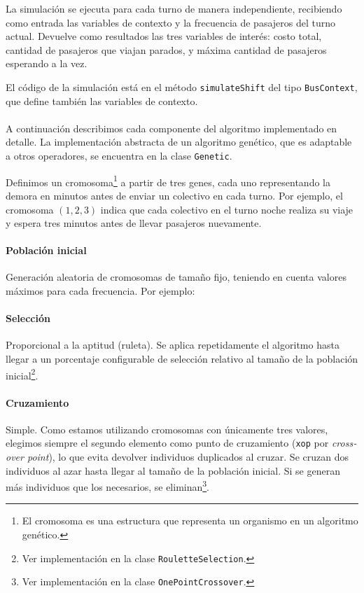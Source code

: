 \documentclass{conaiisi}
\begin{document}
\begin{multicols}{2}
La simulación se ejecuta para cada turno de manera independiente, recibiendo como entrada las variables de contexto y la frecuencia de pasajeros del turno actual.
Devuelve como resultados las tres variables de interés: costo total, cantidad de pasajeros que viajan parados, y máxima cantidad de pasajeros esperando a la vez.

El código de la simulación está en el método \texttt{simulateShift} del tipo \texttt{BusContext}, que define también las variables de contexto.

\paragraph{}
A continuación describimos cada componente del algoritmo implementado en detalle.
La implementación abstracta de un algoritmo genético, que es adaptable a otros operadores, se encuentra en la clase \texttt{Genetic}.


Definimos un cromosoma\footnote{El cromosoma es una estructura que representa un organismo en un algoritmo genético.} a partir de tres genes, cada uno representando la demora en minutos antes de enviar un colectivo en cada turno.
Por ejemplo, el cromosoma $(1,2,3)$ indica que cada colectivo en el turno noche realiza su viaje y espera tres minutos antes de llevar pasajeros nuevamente.


\paragraph{Población inicial} Generación aleatoria de cromosomas de tamaño fijo, teniendo en cuenta valores máximos para cada frecuencia.
Por ejemplo:



\paragraph{Selección} Proporcional a la aptitud (ruleta). Se aplica repetidamente el algoritmo hasta llegar a un porcentaje configurable de selección relativo al tamaño de la población inicial\footnote{Ver implementación en la clase \texttt{RouletteSelection}.}.

\paragraph{Cruzamiento} Simple.
Como estamos utilizando cromosomas con únicamente tres valores, elegimos siempre el segundo elemento como punto de cruzamiento (\texttt{xop} por \textit{\foreignlanguage{english}{crossover point}}), lo que evita devolver individuos duplicados al cruzar.
Se cruzan dos individuos al azar hasta llegar al tamaño de la población inicial.
Si se generan más individuos que los necesarios, se eliminan\footnote{Ver implementación en la clase \texttt{OnePointCrossover}.}.


\end{multicols}
\end{document}
